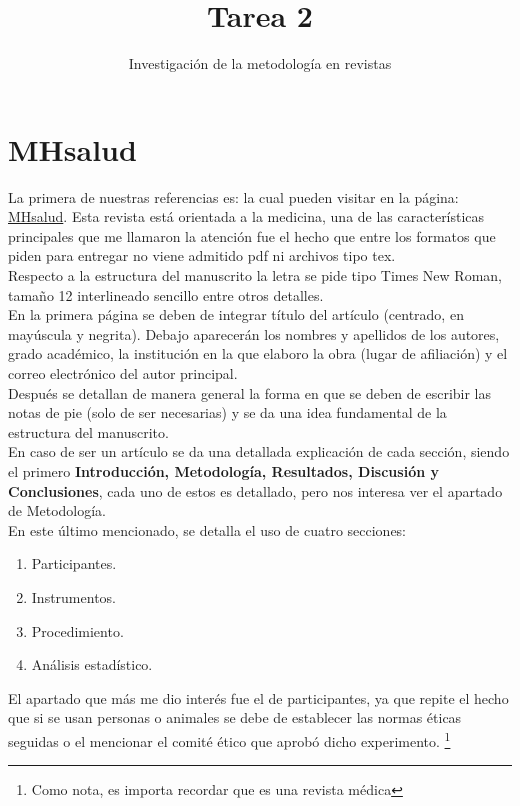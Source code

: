 \documentclass{article}
\title{Tarea 2}
\author{Investigación de la metodología en revistas}
\theoremstyle{mytheoremstyle}
\theoremstyle{mytheoremstyle}
\theoremstyle{myproblemstyle}
\begin{document}
    \maketitle
    \thispagestyle{empty}

    \newpage
    \section*{MHsalud}
    La primera de nuestras referencias es: \cite{mhsalud} la cual pueden visitar en la página: 
    \href{https://www.revistas.una.ac.cr/index.php/mhsalud}{MHsalud}.
    \newline
    Esta revista está orientada a la medicina, una de las características principales que me 
    llamaron la atención fue el hecho que entre los formatos que piden para entregar no viene 
    admitido pdf ni archivos tipo tex. 
    \\ Respecto a la estructura del manuscrito la letra se pide tipo Times New Roman, tamaño 12 
    interlineado sencillo entre otros detalles.
    \\ En la primera página se deben de integrar título del artículo (centrado, en mayúscula y 
    negrita). Debajo aparecerán los nombres y apellidos de los autores, grado académico, la 
    institución en la que elaboro la obra (lugar de afiliación) y el correo electrónico del 
    autor principal. 
    \\ Después se detallan de manera general la forma en que se deben de escribir las notas de
    pie (solo de ser necesarias) y se da una idea fundamental de la estructura del manuscrito.
    \\ En caso de ser un artículo se da una detallada explicación de cada sección, siendo 
    el primero {\bfseries Introducción, Metodología, Resultados, Discusión y Conclusiones}, cada uno de estos
    es detallado, pero nos interesa ver el apartado de Metodología.
    \\ En este último  mencionado, se detalla el uso de cuatro secciones:
    \begin{enumerate}
        \item Participantes.
        \item Instrumentos.
        \item Procedimiento.
        \item Análisis estadístico.
    \end{enumerate}
    El apartado que más me dio interés fue el de participantes, ya que repite el hecho que si se usan personas o 
    animales se debe de establecer las normas éticas seguidas o el mencionar el comité ético que aprobó dicho 
    experimento. \footnote{Como nota, es importa recordar que es una revista médica}
\end{document}
